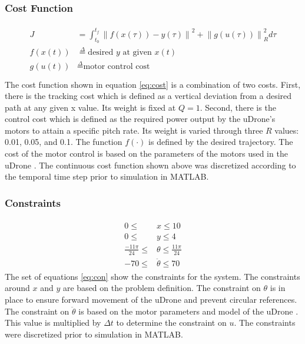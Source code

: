 \subsubsection{Cost Function}
\begin{align}
    \begin{split}
        J&=\int _{t_{0}}^{t_{f}}\left\| f\left( x\left( \tau \right) \right) -y\left( \tau \right) \right\| ^{2} + \left\| g\left( u\left( \tau \right) \right) \right\| _{R}^{2}d\tau \\
        f\left( x\left( t \right) \right) &\overset{\Delta}{=} \text{desired } y \text{ at given } x\left( t \right)\\
        g\left( u\left( t \right) \right) &\overset{\Delta}{=} \text{motor control cost}\\
    \end{split}\label{eq:cost}
\end{align}
The cost function shown in equation \ref{eq:cost} is a combination of two costs. First, there is the tracking cost which is defined as a vertical deviation from a desired path at any given x value. Its weight is fixed at $Q = 1$. Second, there is the control cost which is defined as the required power output by the uDrone's motors to attain a specific pitch rate. Its weight is varied through three $R$ values: 0.01, 0.05, and 0.1. The function $f \left ( \cdot \right )$ is defined by the desired trajectory. The cost of the motor control is based on the parameters of the motors used in the uDrone \parencite{t200}. The continuous cost function shown above was discretized according to the temporal time step prior to simulation in MATLAB.

\subsubsection{Constraints}
\begin{align}
    \begin{split}
        0\leq & x \leq 10\\
        0\leq & y\leq 4\\
        \frac {-11\pi } {24}\leq & \theta\leq\frac {11\pi } {24}\\
        -70 \leq & \ddot \theta\leq 70
    \end{split}\label{eq:con}
\end{align}
The set of equations \ref{eq:con} show the constraints for the system. The constraints around $x$ and $y$ are based on the problem definition. The constraint on $\theta$ is in place to ensure forward movement of the uDrone and prevent circular references. The constraint on $\ddot \theta$ is based on the motor parameters and model of the uDrone \parencite{t200}. This value is multiplied by $\Delta t$ to determine the constraint on $u$. The constraints were discretized prior to simulation in MATLAB.
